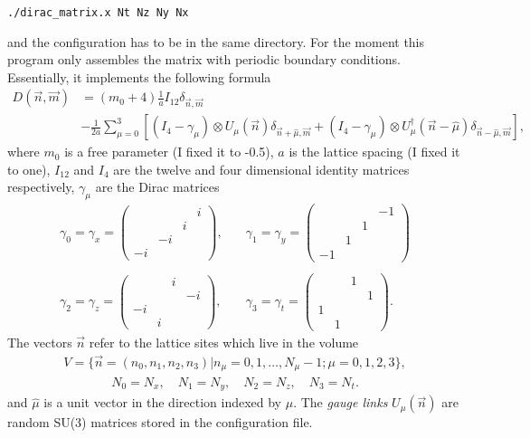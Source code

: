 \documentclass[a4paper,12pt]{scrartcl}
\begin{document}
\begin{center}
 \texttt{./dirac\_matrix.x Nt Nz Ny Nx}
\end{center}and the configuration has to be in the same directory. For the moment this program only assembles the matrix with periodic boundary conditions. Essentially, it implements the following formula \begin{align*}
    D(\vec{n},\vec{m})&=\left(m_0+4 \right)\frac{1}{a}I_{12}\delta_{\vec{n},\vec{m}}  \\
    &- \frac{1}{2a} \sum_{\mu=0}^3 \left[ (I_4-\gamma_\mu)\otimes U_\mu(\vec{n}) \delta_{\vec{n}+\hat{\mu}, \vec{m}}+ (I_4-\gamma_\mu)\otimes U_\mu^\dagger(\vec{n}-\hat{\mu})\delta_{\vec{n}-\hat{\mu},\vec{m}}\right],
\end{align*}where $m_0$ is a free parameter (I fixed it to -0.5), $a$ is the lattice spacing (I fixed it to one), $I_{12}$ and $I_4$ are the twelve and four dimensional identity matrices respectively, $\gamma_\mu$ are the Dirac matrices \begin{align*}
        \gamma_0 =\gamma_x= \begin{pmatrix}
          & & & i \\
          & & i & \\
          & -i & & \\
          -i & & &
        \end{pmatrix}, &\quad \gamma_1 = \gamma_y = \begin{pmatrix}
          & &  & -1 \\
          & & 1 &  \\
           & 1 & & \\
          -1 &  & &
        \end{pmatrix}\\ \\
        \gamma_2 = \gamma_z = \begin{pmatrix}
          & & i &  \\
          & &  & -i \\
          -i &  & & \\
           & i & &
        \end{pmatrix},&\quad \gamma_3 = \gamma_t = \begin{pmatrix}
          & & 1 &  \\
          & &  & 1 \\
          1 &  & & \\
           & 1 & &
        \end{pmatrix}.
    \end{align*}The vectors $\vec{n}$ refer to the lattice sites which live in the volume \begin{align*} V=\lbrace \vec{n}=(n_0,n_1,n_2,n_3)| n_\mu=0,1,\dots,N_\mu-1; \mu=0,1,2,3 \rbrace, \end{align*}\begin{align*}  N_0 = N_x, \quad N_1=N_y, \quad N_2=N_z, \quad N_3=N_t.\end{align*}and $\hat{\mu}$ is a unit vector in the direction indexed by $\mu$. The \textit{gauge links} $U_\mu(\vec{n})$ are random SU(3) matrices stored in the configuration file.
\end{document}
